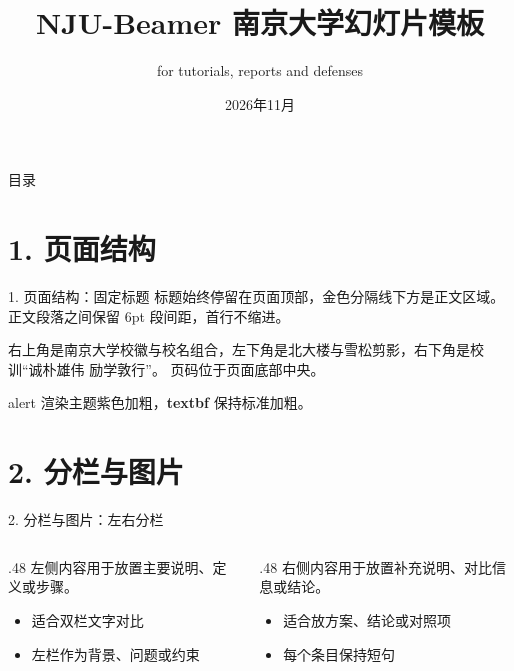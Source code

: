 \documentclass[aspectratio=169,10pt]{beamer}
\title[NJU-Beamer]{NJU-Beamer 南京大学幻灯片模板}
\subtitle{for tutorials, reports and defenses}
\date{2026年11月}
\begin{document}
\NJUtitleframe

\begin{frame}{目录}
  \tableofcontents
\end{frame}

\section{1. 页面结构}

\begin{frame}{1. 页面结构：固定标题}
标题始终停留在页面顶部，金色分隔线下方是正文区域。正文段落之间保留 6pt 段间距，首行不缩进。

右上角是南京大学校徽与校名组合，左下角是北大楼与雪松剪影，右下角是校训“诚朴雄伟 励学敦行”。
页码位于页面底部中央。

\alert{alert} 渲染主题紫色加粗，\textbf{textbf} 保持标准加粗。
\end{frame}

\section{2. 分栏与图片}

\begin{frame}{2. 分栏与图片：左右分栏}
\begin{columns}[T,onlytextwidth]
  \begin{column}{.48\textwidth}
    左侧内容用于放置主要说明、定义或步骤。
    \begin{itemize}
      \item 适合双栏文字对比
      \item 左栏作为背景、问题或约束
    \end{itemize}
  \end{column}
  \begin{column}{.48\textwidth}
    右侧内容用于放置补充说明、对比信息或结论。
    \begin{itemize}
      \item 适合放方案、结论或对照项
      \item 每个条目保持短句
    \end{itemize}
  \end{column}
\end{columns}
\end{frame}
\end{document}
